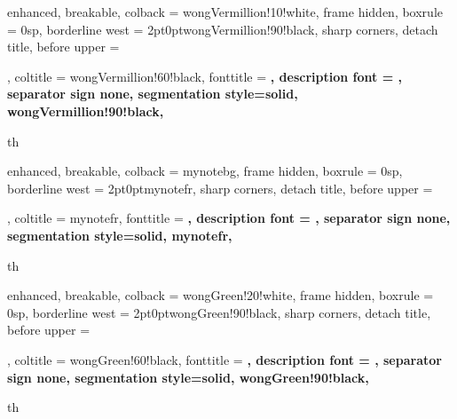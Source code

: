 


{%
	enhanced,
	breakable,
	colback = wongVermillion!10!white,
	frame hidden,
	boxrule = 0sp,
	borderline west = {2pt}{0pt}{wongVermillion!90!black},
	sharp corners,
	detach title,
	before upper = \tcbtitle\par\smallskip,
	coltitle = wongVermillion!60!black,
	fonttitle = \bfseries\sffamily,
	description font = \mdseries,
	separator sign none,
	segmentation style={solid, wongVermillion!90!black},
}
{th}


{%
	enhanced,
	breakable,
	colback = mynotebg,
	frame hidden,
	boxrule = 0sp,
	borderline west = {2pt}{0pt}{mynotefr},
	sharp corners,
	detach title,
	before upper = \tcbtitle\par\smallskip,
	coltitle = mynotefr,
	fonttitle = \bfseries\sffamily,
	description font = \mdseries,
	separator sign none,
	segmentation style={solid, mynotefr},
}
{th}


{%
	enhanced,
	breakable,
	colback = wongGreen!20!white,
	frame hidden,
	boxrule = 0sp,
	borderline west = {2pt}{0pt}{wongGreen!90!black},
	sharp corners,
	detach title,
	before upper = \tcbtitle\par\smallskip,
	coltitle = wongGreen!60!black,
	fonttitle = \bfseries\sffamily,
	description font = \mdseries,
	separator sign none,
	segmentation style={solid, wongGreen!90!black},
}
{th}


